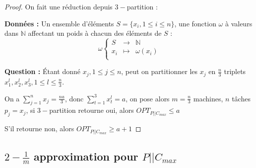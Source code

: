 \documentclass[a4paper, 11pt]{thesis}
\begin{document}
\begin{proof}
    On fait une réduction depuis $3-$partition :

    \textbf{Données :} Un ensemble d'éléments $S = \{x_i, 1 \leq i \leq n\}$, une fonction $\omega$
    à valeurs dans $\mathbb{N}$ affectant un poids à chacun des éléments de $S$ :
    \begin{displaymath}
        \omega \left \lbrace \begin{array}{rcl}
            S & \longrightarrow & \mathbb{N} \\
            x_i & \longmapsto & \omega(x_i) \\
        \end{array} \right .
    \end{displaymath}

    \textbf{Question :} Étant donné $x_j, 1 \leq j \leq n$, peut on partitionner les $x_j$ en $\frac{n}{3}$ triplets $x_1^l,
    x_2^l, x_3^l, 1 \leq l \leq \frac{n}{3}$. 
    
    On a $\sum_{j = 1}^n x_j = \frac{na}{3}$, donc $\sum_{t=1}^3 x_t^l = a$, on pose alors $m =
    \frac{n}{3}$ machines, $n$ tâches $p_j = x_j$, si $3-$partition retourne oui, alors
    $OPT_{P||C_{max}} \leq a$

    \begin{center}
    \end{center}

    S'il retourne non, alors $OPT_{P||C_{max}} \geq a + 1$
\end{proof}

\subsection{$2-\frac{1}{m}$ approximation pour $P||C_{max}$}
\end{document}
